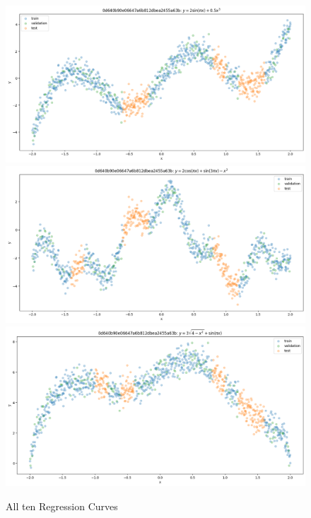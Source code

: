 \documentclass{article}
\numberwithin{equation}{section}
\begin{document}
\begin{figure}[h!]
\begin{minipage}{.49\textwidth}
  \includegraphics[width=\linewidth]{thesis-report/figures/toy_curves/data/curve5/data.png}
  \includegraphics[width=\linewidth]{thesis-report/figures/toy_curves/data/curve7/data.png}
  \includegraphics[width=\linewidth]{thesis-report/figures/toy_curves/data/curve9/data.png}
\end{minipage}%
\label{toy-curves}
\caption{All ten Regression Curves}
\end{figure}
\end{document}
